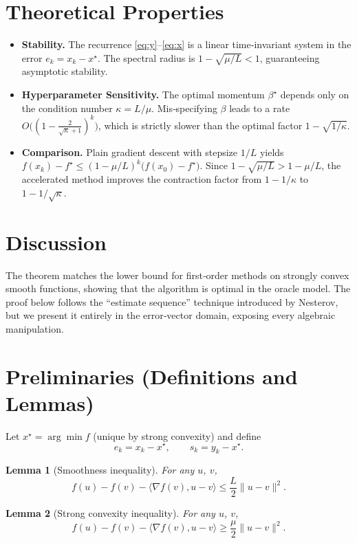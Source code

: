 \documentclass{article}
\newtheorem{lemma}{Lemma}
\begin{document}
\section*{Theoretical Properties}
\begin{itemize}[leftmargin=*]
\item \textbf{Stability.} The recurrence \eqref{eq:y}–\eqref{eq:x} is a linear time‑invariant system in the error $e_{k}=x_{k}-x^{\star}$.  The spectral radius is $1-\sqrt{\mu/L}<1$, guaranteeing asymptotic stability.
\item \textbf{Hyperparameter Sensitivity.} The optimal momentum $\beta^{\star}$ depends only on the condition number $\kappa=L/\mu$.  Mis‑specifying $\beta$ leads to a rate $O\big((1-\tfrac{2}{\sqrt{\kappa}+1})^{k}\big)$, which is strictly slower than the optimal factor $1-\sqrt{1/\kappa}$.
\item \textbf{Comparison.} Plain gradient descent with stepsize $1/L$ yields $f(x_{k})-f^{\star}\le (1-\mu/L)^{k}\bigl(f(x_{0})-f^{\star}\bigr)$.  Since $1-\sqrt{\mu/L}>1-\mu/L$, the accelerated method improves the contraction factor from $1-1/\kappa$ to $1-1/\sqrt{\kappa}$.
\end{itemize}

\section*{Discussion}
The theorem matches the lower bound for first‑order methods on strongly convex smooth functions, showing that the algorithm is optimal in the oracle model.  The proof below follows the ``estimate sequence'' technique introduced by Nesterov, but we present it entirely in the error‑vector domain, exposing every algebraic manipulation.

\section*{Preliminaries (Definitions and Lemmas)}
\begin{definition}
Let $x^{\star}=\arg\min f$ (unique by strong convexity) and define
\[
e_{k}=x_{k}-x^{\star},\qquad s_{k}=y_{k}-x^{\star}.
\]
\end{definition}
\begin{lemma}[Smoothness inequality]\label{lem:smooth}
For any $u$, $v$,
\[
f(u)-f(v)-\langle\nabla f(v),u-v\rangle\le\frac{L}{2}\|u-v\|^{2}.
\]
\end{lemma}
\begin{lemma}[Strong convexity inequality]\label{lem:strong}
For any $u$, $v$,
\[
f(u)-f(v)-\langle\nabla f(v),u-v\rangle\ge\frac{\mu}{2}\|u-v\|^{2}.
\]
\end{lemma}
\end{document}
